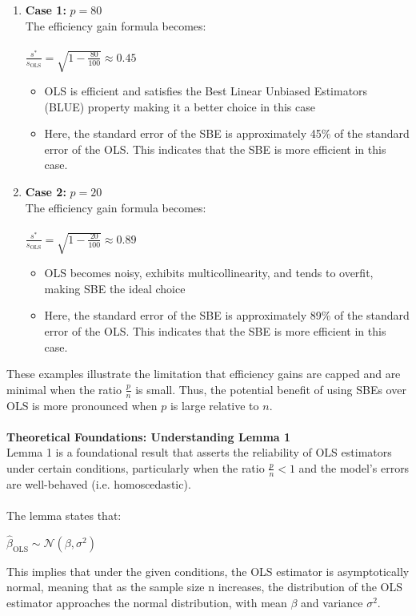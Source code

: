 \begin{enumerate}
    \item \textbf{Case 1:} $p = 80$\\
   The efficiency gain formula becomes:\\
    \\
    $\frac{s^*}{s_{\text{OLS}}} = \sqrt{1 - \frac{80}{100}} \approx 0.45$
    \begin{itemize}
        \item OLS is efficient and satisfies the Best Linear Unbiased Estimators (BLUE) property making it a better choice in this case
        \item Here, the standard error of the SBE is approximately 45\% of the standard error of the OLS. This indicates that the SBE is more efficient in this case. 
    \end{itemize}

    
    \item \textbf{Case 2:} $p = 20$\\
    The efficiency gain formula becomes:\\
    \\
    $\frac{s^*}{s_{\text{OLS}}} = \sqrt{1 - \frac{20}{100}} \approx 0.89$\\
    \begin{itemize}
        \item OLS becomes noisy, exhibits multicollinearity, and tends to overfit, making SBE the ideal choice
        \item Here, the standard error of the SBE is approximately 89\% of the standard error of the OLS. This indicates that the SBE is more efficient in this case. 
    \end{itemize}
   
\end{enumerate}

These examples illustrate the limitation that efficiency gains are capped and are minimal when the ratio $\frac{p}{n}$ is small. Thus, the potential benefit of using SBEs over OLS is more pronounced when $p$ is large relative to $n$.
\\
\\
\textbf{Theoretical Foundations: Understanding Lemma 1} \\
Lemma 1 is a foundational result that asserts the reliability of OLS estimators under certain conditions, particularly when the ratio $\frac{p}{n} < 1$ and the model's errors are well-behaved (i.e. homoscedastic).\\
\\
The lemma states that: 
\begin{center}
    $\hat{\beta}_{\text{OLS}} \sim \mathcal{N}(\beta, \sigma^2)$    
\end{center}
This implies that under the given conditions, the OLS estimator is asymptotically normal, meaning that as the sample size n increases, the distribution of the OLS estimator approaches the normal distribution, with mean $\beta$ and variance $\sigma^2$.